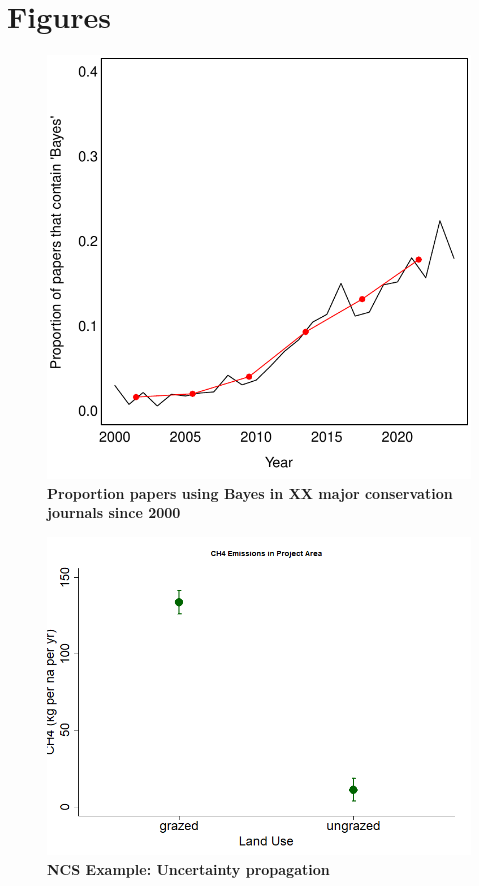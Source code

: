 \documentclass{article}
\begin{document}


\section* {Figures}

\begin{figure}[h]
\centering
 \includegraphics{../figs/conservation.pdf}
 \caption{\textbf{Proportion papers using Bayes in XX major conservation journals since 2000}} 
 \label{fig:consbaystrend}
 \end{figure}
 
 \begin{figure}[h]
\centering
 \includegraphics{../figs/ncs/ncsprojimpactch4.png}
 \caption{\textbf{NCS Example: Uncertainty propagation}} 
 \label{fig:ncs}
 \end{figure}
\end{document}

